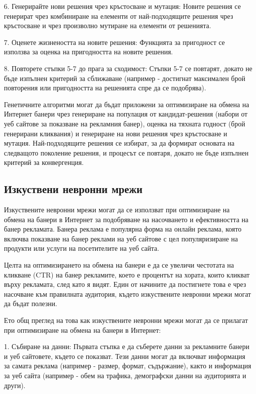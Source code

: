 6. Генерирайте нови решения чрез кръстосване и мутация: Новите решения се генерират чрез комбиниране на елементи от най-подходящите решения чрез кръстосване и чрез произволно мутиране на елементи от решенията.

7. Оценете жизнеността на новите решения: Функцията за пригодност се използва за оценка на пригодността на новите решения.

8. Повторете стъпки 5-7 до прага за сходимост: Стъпки 5-7 се повтарят, докато не бъде изпълнен критерий за сближаване (например - достигнат максимален брой повторения или пригодността на решенията спре да се подобрява).

Генетичните алгоритми могат да бъдат приложени за оптимизиране на обмена на Интернет банери чрез генериране на популация от кандидат-решения (набори от уеб сайтове за показване на рекламния банер), оценка на тяхната годност (брой генерирани кликвания) и генериране на нови решения чрез кръстосване и мутация. Най-подходящите решения се избират, за да формират основата на следващото поколение решения, и процесът се повтаря, докато не бъде изпълнен критерий за конвергенция.

\subsection{Изкуствени невронни мрежи}

Изкуствените невронни мрежи могат да се използват при оптимизиране на обмена на банери в Интернет за подобряване на насочването и ефективността на банер рекламата. Банера реклама е популярна форма на онлайн реклама, която включва показване на банер реклами на уеб сайтове с цел популяризиране на продукти или услуги на посетителите на уеб сайта.

Целта на оптимизирането на обмена на банери е да се увеличи честотата на кликване (CTR) на банер рекламите, което е процентът на хората, които кликват върху рекламата, след като я видят. Един от начините да постигнете това е чрез насочване към правилната аудитория, където изкуствените невронни мрежи могат да бъдат полезни.

Ето общ преглед на това как изкуствените невронни мрежи могат да се прилагат при оптимизиране на обмена на банери в Интернет:

1. Събиране на данни: Първата стъпка е да съберете данни за рекламните банери и уеб сайтовете, където се показват. Тези данни могат да включват информация за самата реклама (например - размер, формат, съдържание), както и информация за уеб сайта (например - обем на трафика, демографски данни на аудиторията и други).

